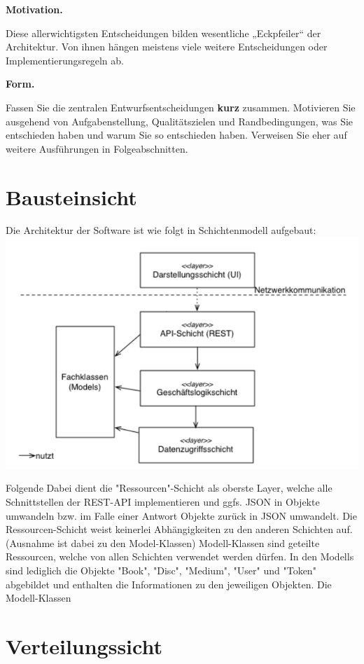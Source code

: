 \documentclass[]{article}
\begin{document}
\textbf{Motivation.}

Diese allerwichtigsten Entscheidungen bilden wesentliche „Eckpfeiler``
der Architektur. Von ihnen hängen meistens viele weitere Entscheidungen
oder Implementierungsregeln ab.

\textbf{Form.}

Fassen Sie die zentralen Entwurfsentscheidungen \textbf{kurz} zusammen.
Motivieren Sie ausgehend von Aufgabenstellung, Qualitätszielen und
Randbedingungen, was Sie entschieden haben und warum Sie so entschieden
haben. Verweisen Sie eher auf weitere Ausführungen in Folgeabschnitten.

\section{Bausteinsicht}\label{section-building-block-view}
Die Architektur der Software ist wie folgt in Schichtenmodell aufgebaut:
\includegraphics{images/SoftwareLayers.png}

 Folgende  Dabei dient die "Ressourcen"-Schicht als oberste Layer, welche alle Schnittstellen der REST-API implementieren und ggfs. JSON in Objekte umwandeln bzw. im Falle einer Antwort Objekte zurück in JSON umwandelt. Die Ressourcen-Schicht weist keinerlei Abhängigkeiten zu den anderen Schichten auf. (Ausnahme ist dabei zu den Model-Klassen)
Modell-Klassen sind geteilte Ressourcen, welche von allen Schichten verwendet werden dürfen. In den Modells sind lediglich die Objekte "Book", "Disc", "Medium", "User" und "Token" abgebildet und enthalten die Informationen zu den jeweiligen Objekten. Die Modell-Klassen


\section{Verteilungssicht}\label{section-deployment-view}
\end{document}
